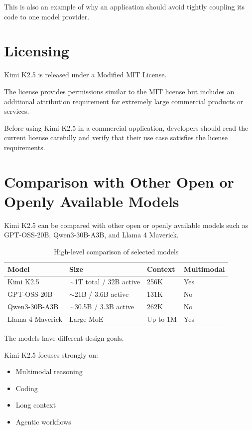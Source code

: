 \documentclass{article}
\begin{document}
This is also an example of why an application should avoid tightly coupling its code to one model provider.

\section{Licensing}

Kimi K2.5 is released under a Modified MIT License.

The license provides permissions similar to the MIT license but includes an additional attribution requirement for extremely large commercial products or services.

Before using Kimi K2.5 in a commercial application, developers should read the current license carefully and verify that their use case satisfies the license requirements.

\section{Comparison with Other Open or Openly Available Models}

Kimi K2.5 can be compared with other open or openly available models such as GPT-OSS-20B, Qwen3-30B-A3B, and Llama 4 Maverick.

\begin{table}[h]
\centering
\begin{tabular}{llll}
\hline
Model & Size & Context & Multimodal \\
\hline
Kimi K2.5 & $\sim$1T total / 32B active & 256K & Yes \\
GPT-OSS-20B & $\sim$21B / 3.6B active & 131K & No \\
Qwen3-30B-A3B & $\sim$30.5B / 3.3B active & 262K & No \\
Llama 4 Maverick & Large MoE & Up to 1M & Yes \\
\hline
\end{tabular}
\caption{High-level comparison of selected models}
\end{table}

The models have different design goals.

Kimi K2.5 focuses strongly on:

\begin{itemize}
\item Multimodal reasoning
\item Coding
\item Long context
\item Agentic workflows
\end{itemize}
\end{document}

